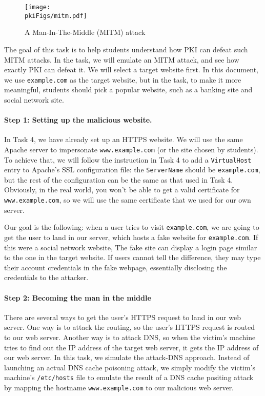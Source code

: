 \begin{figure}[htb]
   \begin{center}
      \texttt{[image: \\pkiFigs/mitm.pdf]}
   \end{center}
   \caption{A Man-In-The-Middle (MITM) attack}
   \label{pki:fig:mitm}
\end{figure}



The goal of this task is to help students understand how PKI can defeat such MITM attacks. 
In the task, we will emulate an MITM attack, and see how exactly PKI can defeat it.
We will select a target website first. In this document, we use 
\texttt{example.com} as the target website, but in the task, to make it more meaningful,
students should pick a popular website, such as a banking site and social network site. 


\paragraph{Step 1: Setting up the malicious website.} 
In Task 4, we have already set up an HTTPS website. We will
use the same Apache server to impersonate \texttt{www.example.com} (or the site chosen by students).  
To achieve that, we will follow the instruction in Task 4 to 
add a \texttt{VirtualHost} entry to Apache's SSL configuration file: the
\texttt{ServerName} should be \texttt{example.com}, but the rest of the
configuration can be the same as that used in Task 4. Obviously, in the real world,
you won't be able to get a valid certificate for \texttt{www.example.com}, 
so we will use the same certificate that we used for our own server. 


Our goal is the following: when a user tries to visit \texttt{example.com}, 
we are going to get the user to land in our server, which hosts 
a fake website for \texttt{example.com}. If this were a social network
website, The fake site can display a login page similar to the
one in the target website. If users cannot tell the difference, they may type their account credentials
in the fake webpage, essentially disclosing the credentials to the attacker. 


\paragraph{Step 2: Becoming the man in the middle} 
There are several ways to get the user's HTTPS request to land in our web server. One way is to
attack the routing, so the user's HTTPS request is routed to our web server. Another way is
to attack DNS, so when the victim's machine tries to find out the IP address of the target
web server, it gets the IP address of our web server. In this task, we simulate
the attack-DNS approach. Instead of
launching an actual DNS cache poisoning attack, we simply modify the victim's machine's 
\texttt{/etc/hosts} file to emulate the result of a DNS cache positing attack by 
mapping the hostname \texttt{www.example.com} to our malicious web server.


